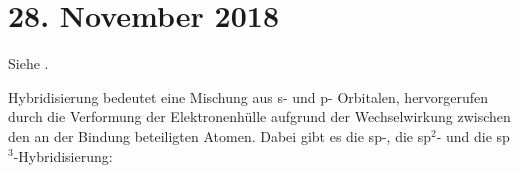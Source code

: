 \section{28. November 2018}
\label{q:61}

Siehe .

\label{q:62}

Hybridisierung bedeutet eine Mischung aus s- und p- Orbitalen,
hervorgerufen durch die Verformung der Elektronenhülle aufgrund
der Wechselwirkung zwischen den an der Bindung beteiligten Atomen.
Dabei gibt es die sp-, die sp$^2$- und die sp$^3$-Hybridisierung:


